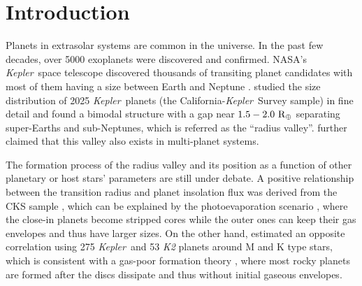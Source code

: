 \documentclass[twocolumn]{aastex631}
\newcommand{\kepler}{\textit{Kepler}\ }
\begin{document}

\section{Introduction}
\label{sec:introduction}
 
Planets in extrasolar systems are common in the universe. In the past few decades, over 5000 exoplanets were discovered and confirmed. NASA's \kepler space telescope discovered thousands of transiting planet candidates with most of them having a size between Earth and Neptune \citep{borucki2010}. \citet{Fulton2017} studied the size distribution of 2025 \kepler planets (the California-\kepler Survey sample) in fine detail and found a bimodal structure with a gap near $1.5-2.0\ \rm{R_{\oplus}}$ separating super-Earths and sub-Neptunes, which is referred as the ``radius valley''. \citet{Weiss2018b} further claimed that this valley also exists in multi-planet systems. 

The formation process of the radius valley and its position as a function of other planetary or host stars' parameters are still under debate. A positive relationship between the transition radius and planet insolation flux was derived from the CKS sample \citep{Martinez2019, Petigura2022}, which can be explained by the photoevaporation scenario \citep[e.g.][]{owen_wu2017, Lopez&Rice2018, Fulton2018}, where the close-in planets become stripped cores while the outer ones can keep their gas envelopes and thus have larger sizes. On the other hand, \citet{Cloutier&Menou2020} estimated an opposite correlation using 275 \kepler and 53 \textit{K2} planets around M and K type stars, which is consistent with a gas-poor formation theory \citep[e.g.,][]{Lopez&Rice2018}, where most rocky planets are formed after the discs dissipate and thus without initial gaseous envelopes. %
\end{document}

